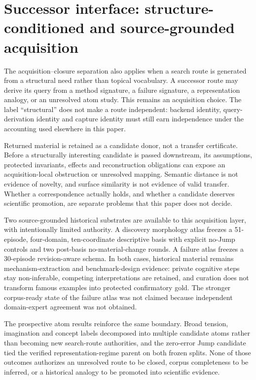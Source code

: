 \section{Successor interface: structure-conditioned and source-grounded acquisition}
\label{sec:p2-structure-conditioned-interface}

The acquisition--closure separation also applies when a search route is generated from a structural need rather than topical vocabulary. A successor route may derive its query from a method signature, a failure signature, a representation analogy, or an unresolved atom study. This remains an acquisition choice. The label ``structural'' does not make a route independent: backend identity, query-derivation identity and capture identity must still earn independence under the accounting used elsewhere in this paper.

Returned material is retained as a candidate donor, not a transfer certificate. Before a structurally interesting candidate is passed downstream, its assumptions, protected invariants, effects and reconstruction obligations can expose an acquisition-local obstruction or unresolved mapping. Semantic distance is not evidence of novelty, and surface similarity is not evidence of valid transfer. Whether a correspondence actually holds, and whether a candidate deserves scientific promotion, are separate problems that this paper does not decide.

Two source-grounded historical substrates are available to this acquisition layer, with intentionally limited authority. A discovery morphology atlas freezes a 51-episode, four-domain, ten-coordinate descriptive basis with explicit no-Jump controls and two post-basis no-material-change rounds. A failure atlas freezes a 30-episode revision-aware schema. In both cases, historical material remains mechanism-extraction and benchmark-design evidence: private cognitive steps stay non-inferable, competing interpretations are retained, and curation does not transform famous examples into protected confirmatory gold. The stronger corpus-ready state of the failure atlas was not claimed because independent domain-expert agreement was not obtained.

The prospective atom results reinforce the same boundary. Broad tension, imagination and concept labels decomposed into multiple candidate atoms rather than becoming new search-route authorities, and the zero-error Jump candidate tied the verified representation-regime parent on both frozen splits. None of those outcomes authorizes an unresolved route to be closed, corpus completeness to be inferred, or a historical analogy to be promoted into scientific evidence.

